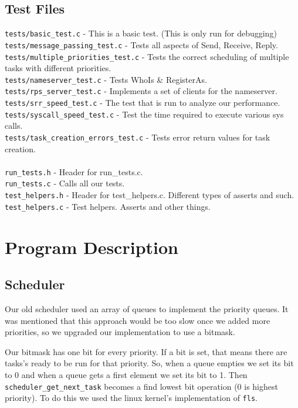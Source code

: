\documentclass[letterpaper]{article}
\begin{document}
\subsection{Test Files}
\verb!tests/basic_test.c! - This is a basic test. (This is only run for debugging)\\
\verb!tests/message_passing_test.c! - Tests all aspects of Send, Receive, Reply.\\
\verb!tests/multiple_priorities_test.c! - Tests the correct scheduling of multiple tasks with different priorities.\\
\verb!tests/nameserver_test.c! - Tests WhoIs \& RegisterAs.\\
\verb!tests/rps_server_test.c! - Implements a set of clients for the nameserver.\\
\verb!tests/srr_speed_test.c! - The test that is run to analyze our performance.\\
\verb!tests/syscall_speed_test.c! - Test the time required to execute various sys calls.\\
\verb!tests/task_creation_errors_test.c! - Tests error return values for task creation.\\
\\
\verb!run_tests.h! - Header for run\_tests.c.\\
\verb!run_tests.c! - Calls all our tests.\\
\verb!test_helpers.h! - Header for test\_helpers.c. Different types of asserts and such.\\
\verb!test_helpers.c! - Test helpers. Asserts and other things.

\section{Program Description}

\subsection{Scheduler}

Our old scheduler used an array of queues to implement the priority queues. It was mentioned that this approach would be too slow once we added more priorities, so we upgraded our implementation to use a bitmask.

Our bitmask has one bit for every priority. If a bit is set, that means there are tasks's ready to be run for that priority. So, when a queue empties we set its bit to 0 and when a queue gets a first element we set its bit to 1. Then {\tt scheduler\_get\_next\_task} becomes a find lowest bit operation (0 is highest priority). To do this we used the linux kernel's implementation of {\tt fls}.
\end{document}

